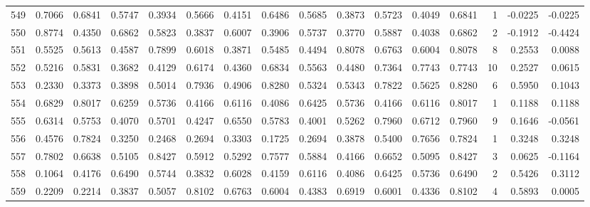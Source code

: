 \begin{tabular}{lrrrrrrrrrrrrrrr}
549 &      0.7066 &  0.6841 &  0.5747 &  0.3934 &  0.5666 &  0.4151 &  0.6486 &  0.5685 &  0.3873 &  0.5723 &   0.4049 &     0.6841 &      1 &                   -0.0225 &                    -0.0225 \\
550 &      0.8774 &  0.4350 &  0.6862 &  0.5823 &  0.3837 &  0.6007 &  0.3906 &  0.5737 &  0.3770 &  0.5887 &   0.4038 &     0.6862 &      2 &                   -0.1912 &                    -0.4424 \\
551 &      0.5525 &  0.5613 &  0.4587 &  0.7899 &  0.6018 &  0.3871 &  0.5485 &  0.4494 &  0.8078 &  0.6763 &   0.6004 &     0.8078 &      8 &                    0.2553 &                     0.0088 \\
552 &      0.5216 &  0.5831 &  0.3682 &  0.4129 &  0.6174 &  0.4360 &  0.6834 &  0.5563 &  0.4480 &  0.7364 &   0.7743 &     0.7743 &     10 &                    0.2527 &                     0.0615 \\
553 &      0.2330 &  0.3373 &  0.3898 &  0.5014 &  0.7936 &  0.4906 &  0.8280 &  0.5324 &  0.5343 &  0.7822 &   0.5625 &     0.8280 &      6 &                    0.5950 &                     0.1043 \\
554 &      0.6829 &  0.8017 &  0.6259 &  0.5736 &  0.4166 &  0.6116 &  0.4086 &  0.6425 &  0.5736 &  0.4166 &   0.6116 &     0.8017 &      1 &                    0.1188 &                     0.1188 \\
555 &      0.6314 &  0.5753 &  0.4070 &  0.5701 &  0.4247 &  0.6550 &  0.5783 &  0.4001 &  0.5262 &  0.7960 &   0.6712 &     0.7960 &      9 &                    0.1646 &                    -0.0561 \\
556 &      0.4576 &  0.7824 &  0.3250 &  0.2468 &  0.2694 &  0.3303 &  0.1725 &  0.2694 &  0.3878 &  0.5400 &   0.7656 &     0.7824 &      1 &                    0.3248 &                     0.3248 \\
557 &      0.7802 &  0.6638 &  0.5105 &  0.8427 &  0.5912 &  0.5292 &  0.7577 &  0.5884 &  0.4166 &  0.6652 &   0.5095 &     0.8427 &      3 &                    0.0625 &                    -0.1164 \\
558 &      0.1064 &  0.4176 &  0.6490 &  0.5744 &  0.3832 &  0.6028 &  0.4159 &  0.6116 &  0.4086 &  0.6425 &   0.5736 &     0.6490 &      2 &                    0.5426 &                     0.3112 \\
559 &      0.2209 &  0.2214 &  0.3837 &  0.5057 &  0.8102 &  0.6763 &  0.6004 &  0.4383 &  0.6919 &  0.6001 &   0.4336 &     0.8102 &      4 &                    0.5893 &                     0.0005 \\

\end{tabular}
